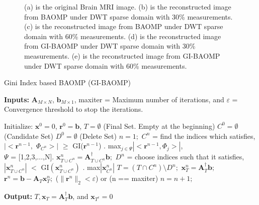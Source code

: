 \documentclass[11pt,conference]{IEEEtran}
\begin{document}
\begin{figure*}
\centering
{}

\caption{(a) is the original Brain MRI image. (b) is the reconstructed image from BAOMP under DWT sparse domain with 30\% measurements. (c) is the reconstructed image from BAOMP under DWT sparse domain with 60\% measurements. (d) is the reconstructed image from GI-BAOMP under DWT sparse domain with 30\% measurements. (e) is the reconstructed image from GI-BAOMP under DWT sparse domain with 60\% measurements.}
\end{figure*}

\begin{algorithm}
 \caption{Gini Index based BAOMP (GI-BAOMP)}
\label{alg: gi-baomp}
{\bf Inputs:} $\mathbf{A}_{M \times N}$, $\mathbf{b}_{M \times 1}$, maxiter = Maximum number of iterations, and $\varepsilon$ = Convergence threshold to stop the iterations.
\begin{algorithmic}
\State Initialize: $\mathbf{x}^0 = 0$, $\mathbf{r}^0 = \mathbf{b}$, 
\State $T = \emptyset$ (Final Set. Empty at the beginning) 
\State $C^0 = \emptyset$ (Candidate Set) 
\State $D^0 = \emptyset$ (Delete Set) 
\State $n = 1;$ 
\Repeat
\State $C^n$ = find the indices which satisfies, \\ \hspace{1.6cm} $|<\mathbf{r}^{n-1},$ $\Phi_{C^n}>|$ $\geq$ GI($\mathbf{r}^{n-1}$) . max$_{j\in \Psi} |<\mathbf{r}^{n-1},\Phi_{j}>|$, \\ \hspace{1.6cm}$\Psi$ = [1,2,3,...,N]. %
\State $\mathbf{x}_{T \cup C^n}^n = \mathbf{A}^\dagger_{T \cup C^n}  \mathbf{b};$
\State $D^n$ = choose indices such that it satisfies, \\ \hspace{1.6cm} $|\mathbf{x}^n_{T \cup C^n}|$ $<$ GI$(\mathbf{x}^n_{T \cup C^n})$ . max$|\mathbf{x}^n_{C^n}|$
\State $T = (T \cap C^n) \setminus D^n;$
\State $\mathbf{x}_T^n = \mathbf{A}^\dagger_T  \mathbf{b};$
\State $\mathbf{r}^n = \mathbf{b} - \mathbf{A}_T \mathbf{x}_T^n;$
\Until($\|\mathbf{r}^n\|_2 < \varepsilon$) or (n == maxiter)
\State $n = n + 1;$
\end{algorithmic}

{\bf Output:} $T, \mathbf{x}_T = \mathbf{A}^\dagger_T  \mathbf{b}$, and $\mathbf{x}_{T^c} = 0$
\end{algorithm}
\end{document}
